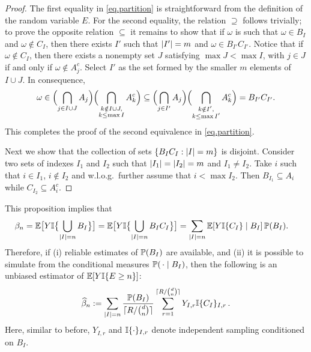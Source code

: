 \begin{proof}

 The first equality in \eqref{eq.partition} is straightforward from the definition of
 the random variable $E$. For the second equality, the relation $\boldsymbol{\supseteq}$ follows trivially;
 to prove the opposite relation $\boldsymbol{\subseteq}$ it remains to show that
 if  $\omega$ is such that $\omega\in B_I$ and $\omega\notin C_I$,
 then there exists $I'$ such that $\lvert I'\rvert=m$ and $\omega\in B_{I'}C_{I'}$.  Notice that
 if $\omega\notin C_I$, then there exists a nonempty set $J$ satisfying
 $\max J<\max I$, with $j\in J$ if and only if $\omega\notin A_j^c$.
 Select $I'$ as the set formed
 by the smaller $m$ elements of $I\cup J$.  In consequence,
 \begin{equation*}
  \omega\in
  \Bigl(\bigcap_{j\in I\cup J}A_j\Bigr) \Bigl(\bigcap_{\substack{k\notin I\cup J,\\k\le\max I}} A_k^c\Bigr)
  \subseteq
  \Bigl(\bigcap_{j\in I'}A_j\Bigr) \Bigl(\bigcap_{\substack{k\notin I',\\k\le\max I'}} A_k^c\Bigr)
  =B_{I'}C_{I'}.
 \end{equation*}
 This completes the proof of the second equivalence in \eqref{eq.partition}.

 Next we show that the collection of sets $\{B_IC_I:\lvert I\rvert=m\}$ is disjoint.  Consider two sets of indexes
 $I_1$ and $I_2$ such that
 $\lvert I_1\rvert=\lvert I_2\rvert=m$ and $I_1\neq I_2$. Take $i$ such that
 $i\in I_1$, $i\notin I_2$ and w.l.o.g.\ further assume that $i<\max I_2$.
 Then $B_{I_1}\subseteq A_i$ while $C_{I_2}\subseteq A_i^c$.
\end{proof}
This proposition implies that
 \begin{align*}
  \beta_n&=\Exp\bigl[Y\indBig{\bigcup_{\card{I}=n} B_I}\bigr]
    =\Exp\bigl[Y\indBig{\bigcup_{\card{I}=n} B_IC_I}\bigr] %
  =\sum_{\card{I}=n}\Exp[Y \ind{C_I} \mid B_I ] \Prob(B_I).
 \end{align*}
  Therefore, if (i)
 reliable estimates of  $\operatorname{{\mathbb P}}(B_I)$ are available, and
 (ii) it is possible to simulate from the conditional measures
 $\operatorname{{\mathbb P}}(\, \cdot \mid B_I)$,
then the following is an unbiased estimator of $\operatorname{{\mathbb E}}[Y\mathbb{I}\{ E\ge n \}]$:
 \begin{equation}\label{beta_hat}
 \widehat{\beta}_n
   :=\sum_{\lvert I\rvert=n} \frac{ \operatorname{{\mathbb P}}(B_I) }{\lceil R/\binom{d}{n} \rceil}
   \sum_{r=1}^{\lceil R/\binom{d}{n} \rceil}
   Y_{I,r} \mathbb{I}\{  C_I  \}_{I,r} \,.
 \end{equation}
 Here, similar to before, $Y_{I,r}$ and $\mathbb{I}\{  \cdot  \}_{I,r}$ denote independent sampling conditioned on $B_I$.

